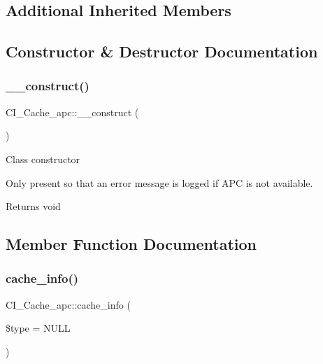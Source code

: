 \subsection*{Additional Inherited Members}


\subsection{Constructor \& Destructor Documentation}
\mbox{\label{class_c_i___cache__apc_a8d8afe54c92276e034958951f77156a4}} 
\subsubsection{\texorpdfstring{\+\_\+\+\_\+construct()}{\_\_construct()}}
{\footnotesize\ttfamily C\+I\+\_\+\+Cache\+\_\+apc\+::\+\_\+\+\_\+construct (\begin{DoxyParamCaption}{ }\end{DoxyParamCaption})}

Class constructor

Only present so that an error message is logged if A\+PC is not available.

\begin{DoxyReturn}{Returns}
void 
\end{DoxyReturn}


\subsection{Member Function Documentation}
\mbox{\label{class_c_i___cache__apc_a55afd4a170374e9324032a679a591a27}} 
\subsubsection{\texorpdfstring{cache\+\_\+info()}{cache\_info()}}
{\footnotesize\ttfamily C\+I\+\_\+\+Cache\+\_\+apc\+::cache\+\_\+info (\begin{DoxyParamCaption}\item[{}]{\$type = {\ttfamily NULL} }\end{DoxyParamCaption})}

